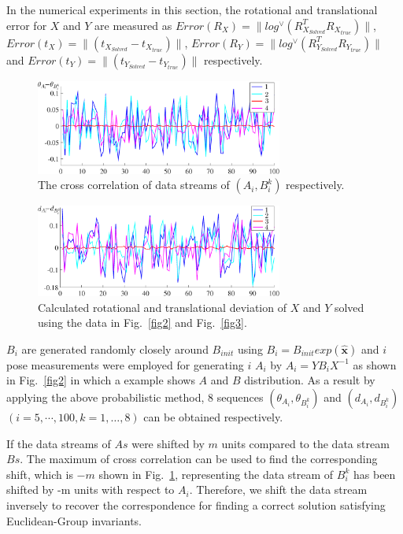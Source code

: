 \documentclass[letterpaper, 10 pt, conference]{ieeeconf}  %
\begin{document}
In the numerical experiments in this section, the rotational and translational error for $X$ and $Y$ are measured as  $Error(R_X) = \parallel log^{\vee} (R_{X_{Solved}}^{T}R_{X_{true}})\parallel$, $Error(t_X) = \parallel (t_{X_{Solved}}-t_{X_{true}})\parallel$, $Error(R_Y) = \parallel log^{\vee} (R_{Y_{Solved}}^{T}R_{Y_{true}})\parallel$ and $Error(t_Y) = \parallel (t_{Y_{Solved}}-t_{Y_{true}})\parallel$ respectively.

\begin{center}
\begin{figure}
\centering
\includegraphics[width=3.2in]{fig4.eps}
\caption{
The cross correlation of data streams of $(A_{i},B_{i}^{k})$ respectively.
}
\label{fig4}
\end{figure}
\end{center}

\begin{center}
\begin{figure}
\centering
\includegraphics[width=3.2in]{fig5.eps}
\caption{
Calculated rotational and translational deviation of $X$ and $Y$ solved using the data in Fig.~\ref{fig2} and Fig.~\ref{fig3}.
}
\label{fig5}
\end{figure}
\end{center}


$B_{i}$ are generated randomly closely around $B_{init}$ using $B_i = B_{init} exp(\mathbf{\widehat{x}})$ and $i$ pose measurements were employed for generating $i$ $A_{i}$ by $A_{i} = YB_{i}X^{-1}$ as shown in Fig.~\ref{fig2} in which a example shows $A$ and $B$ distribution. As a result by applying the above probabilistic method, 8 sequences $(\theta_{A_{i}},\theta_{B_{i}^{k}})$ and $(d_{A_{i}},d_{B_{i}^{k}})$ $ (i=5,\cdots, 100, k=1,\dots,8)$ can be obtained respectively.

If the data streams of $As$ were shifted by $m$ units compared to the data stream $Bs$. The maximum of cross correlation can be used to find the corresponding shift, which is $-m$ shown in Fig.~\ref{fig4}, representing the data stream of $B_{i}^{k}$ has been shifted by -m units with respect to ${A_{i}}$. Therefore, we shift the data stream inversely to recover the correspondence for finding a correct solution satisfying Euclidean-Group invariants.
\end{document}

